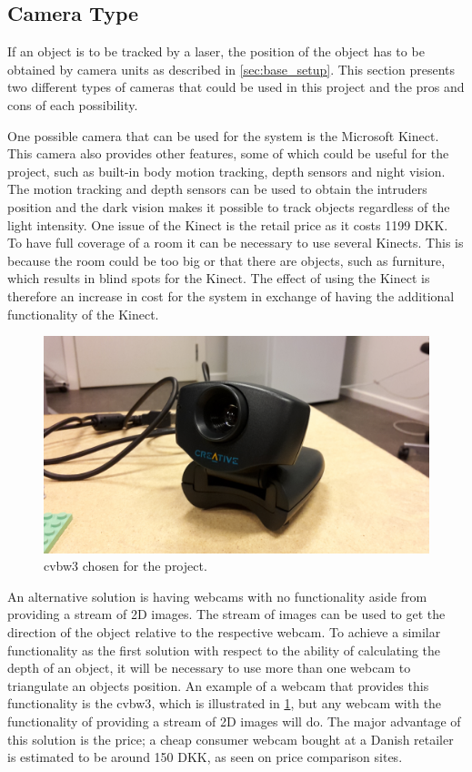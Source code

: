 \subsection{Camera Type}
\label{ss:cam_type}
If an object is to be tracked by a laser, the position of the object has to be obtained by camera units as described in \cref{sec:base_setup}. This section presents two different types of cameras that could be used in this project and the pros and cons of each possibility.

One possible camera that can be used for the system is the Microsoft Kinect. This camera also provides other features, some of which could be useful for the project, such as built-in body motion tracking, depth sensors and night vision\cite{kinect}. The motion tracking and depth sensors can be used to obtain the intruders position and the dark vision makes it possible to track objects regardless of the light intensity. One issue of the Kinect is the retail price as it costs 1199 DKK\cite{kinect_price}. To have full coverage of a room it can be necessary to use several Kinects. This is because the room could be too big or that there are objects, such as furniture, which results in blind spots for the Kinect. The effect of using the Kinect is therefore an increase in cost for the system in exchange of having the additional functionality of the Kinect.

\begin{figure}[ht]
  \centering
  \includegraphics[scale=0.1]{graphics/cvbw3.jpg}
  \caption{\gls{cvbw3} chosen for the project.}
  \label{fig:cvbw3}
\end{figure}

An alternative solution is having webcams with no functionality aside from providing a stream of 2D images. The stream of images can be used to get the direction of the object relative to the respective webcam. To achieve a similar functionality as the first solution with respect to the ability of calculating the depth of an object, it will be necessary to use more than one webcam to triangulate an objects position. An example of a webcam that provides this functionality is the \acrfull{cvbw3}\cite{video_blaster}, which is illustrated in \cref{fig:cvbw3}, but any webcam with the functionality of providing a stream of 2D images will do. The major advantage of this solution is the price; a cheap consumer webcam bought at a Danish retailer is estimated to be around 150 DKK, as seen on price comparison sites\cite{pricerunner_webcam}\cite{ebd_webcam}.

